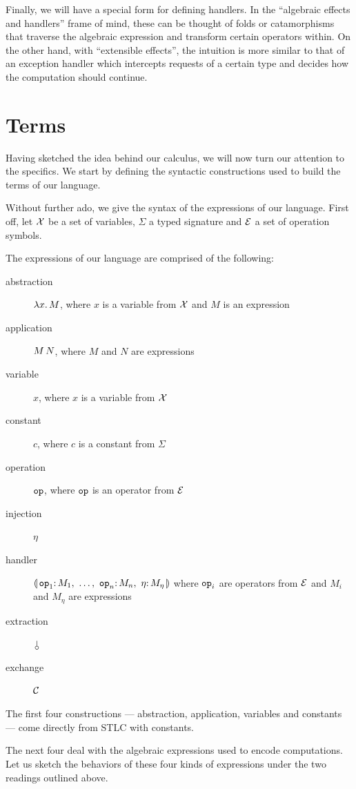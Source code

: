 Finally, we will have a special form for defining handlers. In the
``algebraic effects and handlers'' frame of mind, these can be thought of
folds or catamorphisms that traverse the algebraic expression and transform
certain operators within. On the other hand, with ``extensible effects'',
the intuition is more similar to that of an exception handler which
intercepts requests of a certain type and decides how the computation
should continue.

\section{Terms}

Having sketched the idea behind our calculus, we will now turn our
attention to the specifics. We start by defining the syntactic
constructions used to build the terms of our language.

Without further ado, we give the syntax of the expressions of our
language. First off, let $\mathcal{X}$ be a set of variables, $\Sigma$ a typed
signature and $\mathcal{E}$ a set of operation symbols.

The expressions of our language are comprised of the following:
\begin{description}
  \item[abstraction] $\lambda x.\, M$, where $x$ is a variable from $\mathcal{X}$ and
    $M$ is an expression
  \item[application] $M\,N$, where $M$ and $N$ are expressions
  \item[variable] $x$, where $x$ is a variable from $\mathcal{X}$
  \item[constant] $c$, where $c$ is a constant from $\Sigma$
  \item[operation] $\mathtt{op}$, where $\mathtt{op}$ is an operator from $\mathcal{E}$
  \item[injection] $\eta$
  \item[handler] $\cdbanana$
    where $\mathtt{op}_i$ are operators from $\mathcal{E}$ and $M_i$ and $M_\eta$ are
    expressions
  \item[extraction] $\cherry$
  \item[exchange] $\mathcal{C}$
\end{description}

The first four constructions --- abstraction, application, variables and
constants --- come directly from STLC with constants.

The next four deal with the algebraic expressions used to encode
computations. Let us sketch the behaviors of these four kinds of
expressions under the two readings outlined above.

